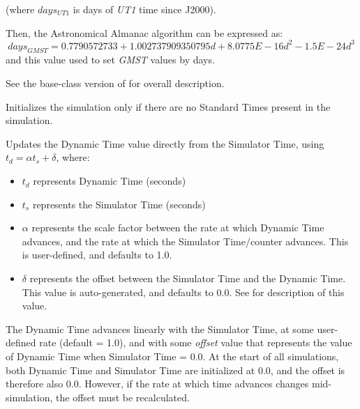 {\begin{enumerate}
{\begin{enumerate}
(where  $days_{UT1}$ is days of \textit{UT1} time since
J2000).

Then, the Astronomical Almanac algorithm can be expressed as:
\begin{equation}
\mathit{days}_{\mathit{GMST}}=0.7790572733+1.002737909350795d+8.0775E-16d^{2}-1.5E-24d^{3}
\end{equation}
and this value used to set \textit{GMST} values by days.

See the base-class version of
 for overall description.


\end{enumerate}}

\label{ref:TimeDyn}


{\begin{enumerate}
Initializes the simulation only if there are no Standard Times present
in the simulation.

Updates the Dynamic Time value directly from the Simulator Time, using
$t_{d}=\alpha t_{s}+\delta $, where:


\begin{itemize}
\item  $t_{d}$ represents Dynamic Time (seconds)
\item  $t_{s}$ represents the Simulator Time (seconds)
\item  $\alpha $ represents the scale factor between the rate at which
Dynamic Time advances, and the rate at which the Simulator Time/counter
advances.  This is user-defined, and defaults to 1.0.
\item  $\delta $ represents the offset between the Simulator Time and
the Dynamic Time.  This value is auto-generated, and defaults to 0.0.
See  for description of this value.
\end{itemize}

\label{ref:updateoffset}
The Dynamic Time advances linearly with the
Simulator Time, at some user-defined rate (default = 1.0), and with
some \textit{offset} value that represents the value of Dynamic Time
when Simulator Time = 0.0.  At the start of all simulations, both
Dynamic Time and Simulator Time are initialized at 0.0, and the offset
is therefore also 0.0.  However, if the rate at which time advances
changes mid-simulation, the offset must be recalculated.


\end{enumerate}}
\end{enumerate}}
